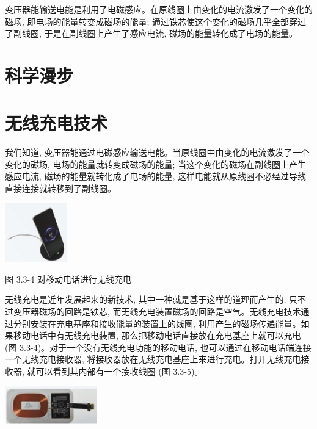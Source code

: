\documentclass[10pt]{article}
\begin{document}
变压器能输送电能是利用了电磁感应。在原线圈上由变化的电流激发了一个变化的磁场, 即电场的能量转变成磁场的能量; 通过铁芯使这个变化的磁场几乎全部穿过了副线圈, 于是在副线圈上产生了感应电流, 磁场的能量转化成了电场的能量。

\section*{科学漫步}

\section*{无线充电技术}

我们知道, 变压器能通过电磁感应输送电能。当原线圈中由变化的电流激发了一个变化的磁场, 电场的能量就转变成磁场的能量; 当这个变化的磁场在副线圈上产生感应电流, 磁场的能量就转化成了电场的能量, 这样电能就从原线圈不必经过导线直接连接就转移到了副线圈。

\begin{center}
\includegraphics[max width=0.2\textwidth]{images/01910e72-c5b7-7ed5-a6d4-fb3a5faefc32_66_278792.jpg}
\end{center}

图 3.3-4 对移动电话进行无线充电

无线充电是近年发展起来的新技术, 其中一种就是基于这样的道理而产生的, 只不过变压器磁场的回路是铁芯, 而无线充电装置磁场的回路是空气。无线充电技术通过分别安装在充电基座和接收能量的装置上的线圈, 利用产生的磁场传递能量。如果移动电话中有无线充电装置, 那么把移动电话直接放在充电基座上就可以充电 (图 3.3-4)。对于一个没有无线充电功能的移动电话, 也可以通过在移动电话端连接一个无线充电接收器, 将接收器放在无线充电基座上来进行充电。打开无线充电接收器, 就可以看到其内部有一个接收线圈 (图 3.3-5)。

\begin{center}
\includegraphics[max width=0.3\textwidth]{images/01910e72-c5b7-7ed5-a6d4-fb3a5faefc32_66_111289.jpg}
\end{center}
\end{document}

